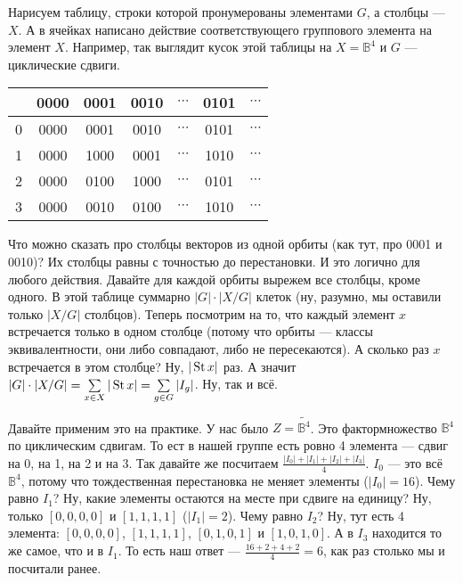 \documentclass{article}
\begin{document}
\begin{itemize}
        \begin{Proof}
            Нарисуем таблицу, строки которой пронумерованы элементами $G$, а столбцы --- $X$. А в ячейках написано действие соответствующего группового элемента на элемент $X$. Например, так выглядит кусок этой таблицы на $X=\mathbb B^4$ и $G$ --- циклические сдвиги.
            \begin{center}
                \begin{tabular}{|c|c|c|c|c|c|c}
                    \hline
                    & 0000 & 0001 & 0010 & $\cdots$ & 0101 & $\cdots$\\
                    \hline
                    0 & 0000 & 0001 & 0010 & $\cdots$ & 0101 & $\cdots$\\
                    \hline
                    1 & 0000 & 1000 & 0001 & $\cdots$ & 1010 & $\cdots$\\
                    \hline
                    2 & 0000 & 0100 & 1000 & $\cdots$ & 0101 & $\cdots$\\
                    \hline
                    3 & 0000 & 0010 & 0100 & $\cdots$ & 1010 & $\cdots$\\
                    \hline
                \end{tabular}
            \end{center}
            Что можно сказать про столбцы векторов из одной орбиты (как тут, про 0001 и 0010)? Их столбцы равны с точностью до перестановки. И это логично для любого действия. Давайте для каждой орбиты вырежем все столбцы, кроме одного. В этой таблице суммарно $|G|\cdot|X/G|$ клеток (ну, разумно, мы оставили только $|X/G|$ столбцов). Теперь посмотрим на то, что каждый элемент $x$ встречается только в одном столбце (потому что орбиты --- классы эквивалентности, они либо совпадают, либо не пересекаются). А сколько раз $x$ встречается в этом столбце? Ну, $|\operatorname{St} x|$ раз. А значит $|G|\cdot|X/G|=\sum\limits_{x\in X}|\operatorname{St} x|=\sum\limits_{g\in G}|I_g|$. Ну, так и всё.
        \end{Proof}
        \begin{Example}
            Давайте применим это на практике. У нас было $Z=\widetilde{\mathbb B^4}$. Это фактормножество $\mathbb B^4$ по циклическим сдвигам. То ест в нашей группе есть ровно 4 элемента --- сдвиг на 0, на 1, на 2 и на 3. Так давайте же посчитаем $\frac{|I_0|+|I_1|+|I_2|+|I_3|}4$. $I_0$ --- это всё $\mathbb B^4$, потому что тождественная перестановка не меняет элементы ($|I_0|=16$). Чему равно $I_1$? Ну, какие элементы остаются на месте при сдвиге на единицу? Ну, только $[0,0,0,0]$ и $[1,1,1,1]$ ($|I_1|=2$). Чему равно $I_2$? Ну, тут есть 4 элемента: $[0,0,0,0]$, $[1,1,1,1]$, $[0,1,0,1]$ и $[1,0,1,0]$. А в $I_3$ находится то же самое, что и в $I_1$. То есть наш ответ --- $\frac{16+2+4+2}4=6$, как раз столько мы и посчитали ранее.

\end{Example}
\end{itemize}
\end{document}
